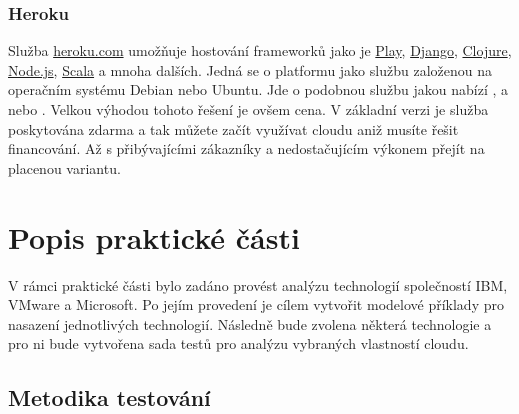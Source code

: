 \subsubsection{Heroku}
Služba \href{https://www.heroku.com}{heroku.com} umožňuje hostování frameworků jako je \href{http://www.playframework.com/}{Play}, \href{https://www.djangoproject.com/}{Django}, \href{http://clojure.org/}{Clojure}, \href{http://nodejs.org/}{Node.js}, \href{http://www.scala-lang.org/}{Scala} a mnoha dalších. Jedná se o platformu jako službu založenou na operačním systému Debian nebo Ubuntu. Jde o podobnou službu jakou nabízí ,  a nebo . Velkou výhodou tohoto řešení je ovšem cena. V základní verzi je služba poskytována zdarma a tak můžete začít využívat cloudu aniž musíte řešit financování. Až s přibývajícími zákazníky a nedostačujícím výkonem přejít na placenou variantu.

\newpage
\section{Popis praktické části}
\label{sec:praktickaCast}
V rámci praktické části bylo zadáno provést analýzu technologií společností IBM, VMware a Microsoft. Po jejím provedení je cílem vytvořit modelové příklady pro nasazení jednotlivých technologií. Následně bude zvolena některá technologie a pro ni bude vytvořena sada testů pro analýzu vybraných vlastností cloudu.

\subsection{Metodika testování}
\label{p:metodikaTestovani}
